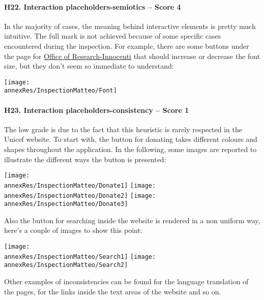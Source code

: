 \paragraph*{H22. Interaction placeholders-semiotics  – Score 4}
In the majority of cases, the meaning behind interactive elements is pretty much intuitive. The full mark is not achieved because of some specific cases encountered during the inspection. 
For example, there are some buttons under the page for \href{https://www.unicef-irc.org/}{Office of Research-Innocenti} that should increase or decrease the font size, but they don't seem so immediate to understand:
\begin{center}
	\texttt{[image: \\annexRes/InspectionMatteo/Font]}
\end{center}


\paragraph*{H23. Interaction placeholders-consistency – Score 1}
The low grade is due to the fact that this heuristic is rarely respected in the Unicef website. To start with, the button for donating takes different colours and shapes throughout the application. 
In the following, some images are reported to illustrate the different ways the button is presented:

\begin{center}
	\texttt{[image: \\annexRes/InspectionMatteo/Donate1]}
	\hspace{2cm}
	\texttt{[image: \\annexRes/InspectionMatteo/Donate2]}
	\hspace{2cm}
	\texttt{[image: \\annexRes/InspectionMatteo/Donate3]}
\end{center}

Also the button for searching inside the website is rendered in a non uniform way, here's a couple of images to show this point:

\begin{center}
	\texttt{[image: \\annexRes/InspectionMatteo/Search1]} \hspace{5cm}
	\texttt{[image: \\annexRes/InspectionMatteo/Search2]}
\end{center}

Other examples of inconsistencies can be found for the language translation of the pages, for the links inside the text areas of the website and so on.


